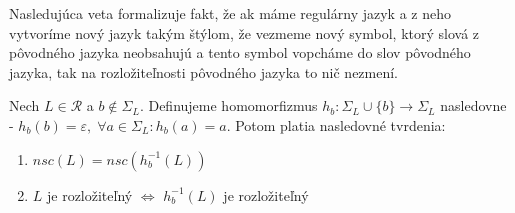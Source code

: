 Nasledujúca veta formalizuje fakt, že ak máme regulárny jazyk a z neho vytvoríme nový jazyk takým štýlom, že vezmeme nový symbol, ktorý slová z pôvodného jazyka neobsahujú a tento symbol \glqq{} vopcháme \grqq{} do slov pôvodného jazyka, tak na rozložiteľnosti pôvodného jazyka to nič nezmení.

\begin{theorem}
\label{thm:new_symbol_in_language}
Nech $ L \in \mathscr{R} $ a $ b \notin \Sigma_L $. Definujeme homomorfizmus $ h_b: \Sigma_L \cup \lbrace b \rbrace \rightarrow \Sigma_L $ nasledovne - $ h_b(b) = \varepsilon, \; \forall a \in \Sigma_L: h_b(a) = a $. Potom platia nasledovné tvrdenia:
\begin{enumerate}[label=(\alph*)]
\item \label{thm:new_symbol_in_language_item_1} $ nsc(L) = nsc(h_{b}^{-1}(L)) $
\item \label{thm:new_symbol_in_language_item_2} $ L $ je rozložiteľný $ \Leftrightarrow $ $ h_{b}^{-1}(L) $ je rozložiteľný
\end{enumerate}
\end{theorem}

